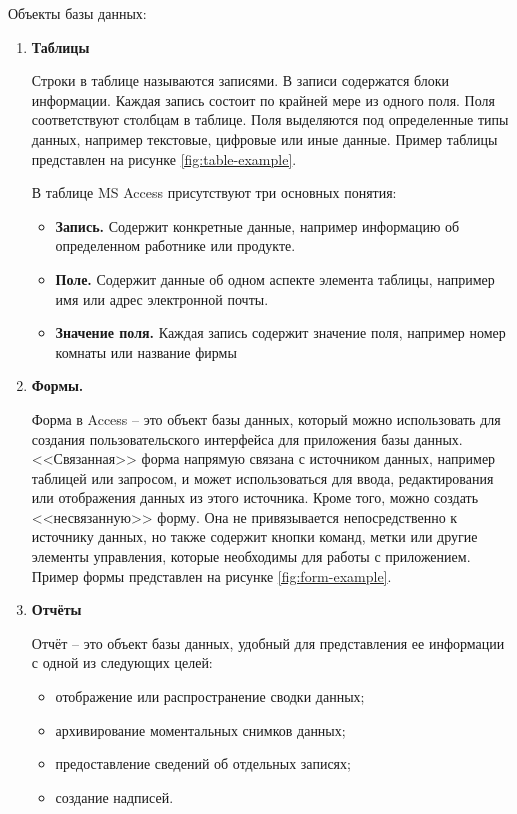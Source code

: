 Объекты базы данных:
\begin{enumerate}
    \item \textbf{Таблицы}
    
    \tab Строки в таблице называются записями. В записи содержатся блоки информации. Каждая запись состоит по крайней мере из одного поля. Поля соответствуют столбцам в таблице. Поля выделяются под определенные типы данных, например текстовые, цифровые или иные данные. Пример таблицы представлен на рисунке \ref{fig:table-example}.

    \tab В таблице MS Access присутствуют три основных понятия:
    \begin{itemize}
        \item \textbf{Запись.} Содержит конкретные данные, например информацию об определенном работнике или продукте.
        \item \textbf{Поле.} Содержит данные об одном аспекте элемента таблицы, например имя или адрес электронной почты.
        \item \textbf{Значение поля.} Каждая запись содержит значение поля, например номер комнаты или название фирмы
    \end{itemize}


    \item \textbf{Формы.}
    
    \tab Форма в Access -- это объект базы данных, который можно использовать для создания пользовательского интерфейса для приложения базы данных. <<Связанная>> форма напрямую связана с источником данных, например таблицей или запросом, и может использоваться для ввода, редактирования или отображения данных из этого источника. Кроме того, можно создать <<несвязанную>> форму. Она не привязывается непосредственно к источнику данных, но также содержит кнопки команд, метки или другие элементы управления, которые необходимы для работы с приложением. Пример формы представлен на рисунке \ref{fig:form-example}.


    \item \textbf{Отчёты}
    
    \tab Отчёт -- это объект базы данных, удобный для представления ее информации с одной из следующих целей:
    \begin{itemize}
        \item отображение или распространение сводки данных;
        \item архивирование моментальных снимков данных;
        \item предоставление сведений об отдельных записях;
        \item создание надписей.
    \end{itemize}


\end{enumerate}
